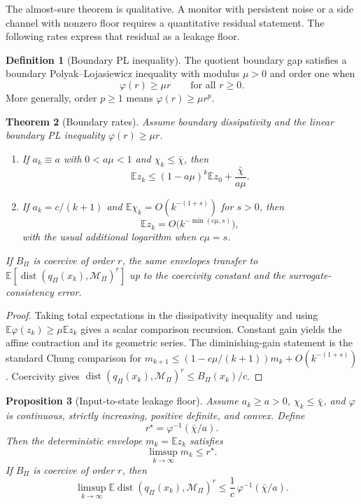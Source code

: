\documentclass[11pt]{article}
\theoremstyle{definition}
\newtheorem{definition}{Definition}[section]
\theoremstyle{plain}
\newtheorem{theorem}[definition]{Theorem}
\newtheorem{proposition}[definition]{Proposition}
\theoremstyle{remark}
\newcommand{\E}{\mathbb{E}}
\newcommand{\cM}{\mathcal{M}}
\begin{document}
The almost-sure theorem is qualitative. A monitor with persistent noise or a side channel with nonzero floor requires a quantitative residual statement. The following rates express that residual as a leakage floor.

\begin{definition}[Boundary PL inequality]
The quotient boundary gap satisfies a boundary Polyak--Lojasiewicz inequality with modulus $\mu>0$ and order one when
\[
    \varphi(r)\ge \mu r\qquad\text{for all }r\ge0.
\]
More generally, order $p\ge1$ means $\varphi(r)\ge\mu r^p$.
\end{definition}

\begin{theorem}[Boundary rates]
Assume boundary dissipativity and the linear boundary PL inequality $\varphi(r)\ge\mu r$.
\begin{enumerate}[leftmargin=2em]
    \item If $a_k\equiv a$ with $0<a\mu<1$ and $\chi_k\le\bar\chi$, then
    \[
        \E z_k\le (1-a\mu)^k\E z_0+\frac{\bar\chi}{a\mu}.
    \]
    \item If $a_k=c/(k+1)$ and $\E\chi_k=O(k^{-(1+s)})$ for $s>0$, then
    \[
        \E z_k=O\bigl(k^{-\min(c\mu,s)}\bigr),
    \]
    with the usual additional logarithm when $c\mu=s$.
\end{enumerate}
If $B_\Pi$ is coercive of order $r$, the same envelopes transfer to $\E[\operatorname{dist}(q_\Pi(x_k),\cM_\Pi)^r]$ up to the coercivity constant and the surrogate-consistency error.
\end{theorem}

\begin{proof}
Taking total expectations in the dissipativity inequality and using $\E\varphi(z_k)\ge \mu\E z_k$ gives a scalar comparison recursion. Constant gain yields the affine contraction and its geometric series. The diminishing-gain statement is the standard Chung comparison for $m_{k+1}\le(1-c\mu/(k+1))m_k+O(k^{-(1+s)})$. Coercivity gives $\operatorname{dist}(q_\Pi(x_k),\cM_\Pi)^r\le B_\Pi(x_k)/c$.
\end{proof}

\begin{proposition}[Input-to-state leakage floor]
Assume $a_k\ge a>0$, $\chi_k\le\bar\chi$, and $\varphi$ is continuous, strictly increasing, positive definite, and convex. Define
\[
    r^\star=\varphi^{-1}(\bar\chi/a).
\]
Then the deterministic envelope $m_k=\E z_k$ satisfies
\[
    \limsup_{k\to\infty}m_k\le r^\star.
\]
If $B_\Pi$ is coercive of order $r$, then
\[
    \limsup_{k\to\infty}\E\operatorname{dist}(q_\Pi(x_k),\cM_\Pi)^r
    \le \frac{1}{c}\,\varphi^{-1}(\bar\chi/a).
\]
\end{proposition}
\end{document}
